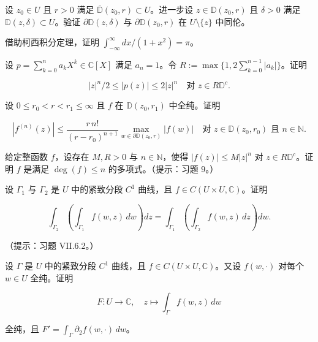 \begin{exercises}
\item

设 $ z_0 \in U $ 且 $ r > 0 $ 满足 $ \overline{\mathbb{D}}(z_0,r) \subset U $。进一步设 $ z \in \mathbb{D}(z_0,r) $ 且 $ \delta > 0 $ 满足 $ \mathbb{D}(z,\delta) \subset U $。验证 $ \partial\mathbb{D}(z,\delta) $ 与 $ \partial\mathbb{D}(z_0,r) $ 在 $ U \setminus \{z\} $ 中同伦。

\item

借助柯西积分定理，证明 $ \int_{-\infty}^{\infty} dx/(1 + x^2) = \pi $。

\item

设 $ p = \sum_{k=0}^{n} a_k X^k \in \mathbb{C}[X] $ 满足 $ a_n = 1 $。令 $ R := \max\{1, 2\sum_{k=0}^{n-1}\left|a_k\right|\} $。证明

\[
|z|^n/2 \le |p(z)| \le 2|z|^n \quad \text{对 } z \in R\mathbb{D}^{c} .
\]
\item

设 $ 0 \le r_0 < r < r_1 \le \infty $ 且 $ f $ 在 $ \mathbb{D}(z_0,r_1) $ 中全纯。证明

\[
\left|f^{(n)}(z)\right| \le \frac{r\,n!}{(r - r_0)^{n+1}} \max_{w \in \partial\mathbb{D}(z_0,r)} |f(w)| \quad \text{对 } z \in \mathbb{D}(z_0,r_0) \text{ 且 } n \in \mathbb{N} .
\]
\item

给定整函数 $ f $，设存在 $ M,R > 0 $ 与 $ n \in \mathbb{N} $，使得 $ |f(z)| \le M|z|^n $ 对 $ z \in R\mathbb{D}^{c} $。证明 $ f $ 是满足 $ \deg(f) \le n $ 的多项式。（提示：习题 9。）

\item

设 $ \Gamma_1 $ 与 $ \Gamma_2 $ 是 $ U $ 中的紧致分段 $ C^1 $ 曲线，且 $ f \in C(U \times U,\mathbb{C}) $。证明

\[
\int_{\Gamma_2}\left(\int_{\Gamma_1} f(w,z)\,dw\right)dz = \int_{\Gamma_1}\left(\int_{\Gamma_2} f(w,z)\,dz\right)dw .
\]

（提示：习题 VII.6.2。）

\item

设 $ \Gamma $ 是 $ U $ 中的紧致分段 $ C^1 $ 曲线，且 $ f \in C(U \times U,\mathbb{C}) $。又设 $ f(w,\cdot) $ 对每个 $ w \in U $ 全纯。证明

\[
F : U \to \mathbb{C} , \quad z \mapsto \int_{\Gamma} f(w,z)\,dw
\]

全纯，且 $ F' = \int_{\Gamma} \partial_2 f(w,\cdot)\,dw $。


\end{exercises}
